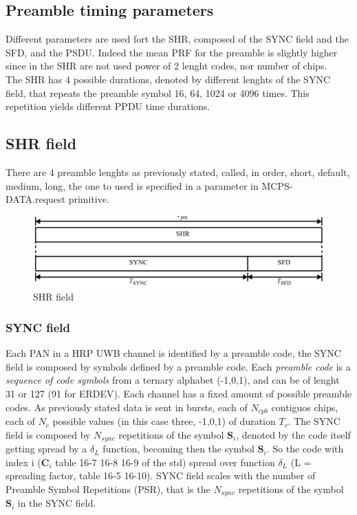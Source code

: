 \documentclass[conference]{IEEEtran}
\begin{document}
\subsection{Preamble timing parameters}
Different parameters are used fort the SHR, composed of the SYNC field and the SFD, and the
PSDU. Indeed the mean PRF for the preamble is slightly higher since in the SHR are not used
power of 2 lenght codes, nor number of chips.\\
The SHR has 4 possible durations, denoted by different lenghts of the SYNC field, that
repeats the preamble symbol 16, 64, 1024 or 4096 times. This repetition yields different PPDU
time durations.

\subsection{SHR field}
There are 4 preamble lenghts as previously stated, called, in order, short, default,
medium, long, the one to used is specified in a parameter in MCPS-DATA.request primitive.

\begin{figure}[!h]
  \centering
  \includegraphics[width=\linewidth]{SHR}
  \caption{SHR field}
  \label{fig:SHR}
\end{figure}

\subsubsection{SYNC field}
\label{SYNC}
Each PAN in a HRP UWB channel is identified by a preamble code, the SYNC field is composed 
by symbols defined by a preamble code. Each \emph{preamble code} is a \emph{sequence of code 
symbols} from a ternary alphabet (-1,0,1), and can be of lenght 31 or 127 (91 for ERDEV). 
Each channel has a fixed amount of possible preamble codes. As previously stated data is sent 
in bursts, each of $N_{cpb}$ contiguos chips, each of $N_{c}$ possible values (in this case 
three, -1,0,1) of duration $T_{c}$. The SYNC field is composed by $N_{sync}$ repetitions of 
the symbol $\mathbf{S}_i$, denoted by the code itself getting spread by a $\delta_{L}$ function,
becoming then the symbol $\mathbf{S}_i$. So the code with index i ($\mathbf{C}_i$ table 16-7 
16-8 16-9 of the std) spread over function $\delta_{L}$ (L = spreading factor, table 16-5 
16-10). SYNC field scales with the number of Preamble Symbol Repetitions (PSR), that is the
$N_{sync}$ repetitions of the symbol $\mathbf{S}_i$ in the SYNC field.
\end{document}
